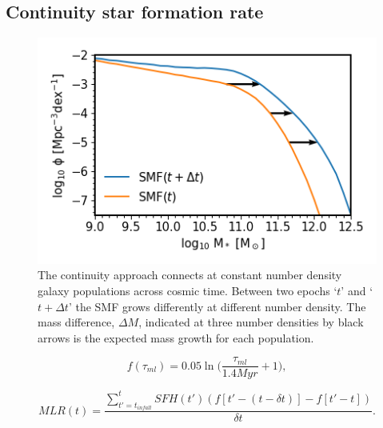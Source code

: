 \subsection{Continuity star formation rate}
\begin{figure}[h]
	\centering
	\includegraphics[width = \linewidth]{Figures/Chapter2/ContinuityEqn.png}
    \caption{The continuity approach connects at constant number density galaxy populations across cosmic time. Between two epochs `$t$' and `$t + \Delta t$' the SMF grows differently at different number density. The mass difference, $\Delta M$, indicated at three number densities by black arrows is the expected mass growth for each population.}
	\label{fig:Cont_Eqn}
\end{figure}


\begin{equation}
\label{eqn:f_ml}
f(\tau_{ml}) = 0.05 \ln \Big(\frac{\tau_{ml}}{1.4 Myr}+1\Big) ,
\end{equation}

\begin{equation}
\label{eqn:MLR}
MLR(t) = \frac{ \sum_{t' = t_{infall}}^{t} SFH(t')(f[t' - (t-\delta t)]-f[t' - t]) }{\delta t} .
\end{equation}


